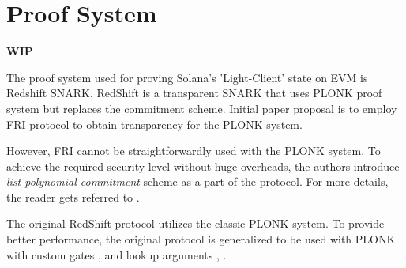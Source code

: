 \section{Proof System}
\label{section:proof_system}
\textbf{WIP}

The proof system used for proving Solana's 'Light-Client' state on EVM is Redshift SNARK\cite{cryptoeprint:2019:1400}.
RedShift is a transparent SNARK that uses PLONK\cite{cryptoeprint:2019:953} proof system but replaces the commitment scheme.
Initial paper proposal is to employ FRI\cite{ben2018fast} protocol to obtain transparency for the PLONK system.

However, FRI cannot be straightforwardly used with the PLONK system.
To achieve the required security level without huge overheads, the authors introduce \textit{list polynomial commitment} scheme as a part of the protocol.
For more details, the reader gets referred to \cite{cryptoeprint:2019:1400}.

The original RedShift protocol utilizes the classic PLONK\cite{cryptoeprint:2019:953} system.
To provide better performance, the original protocol is generalized to be used
with PLONK with custom gates \cite{turbo}, \cite{plonkhalo2} and lookup arguments \cite{cryptoeprint:2020:315}, \cite{lookuphalo2}.
